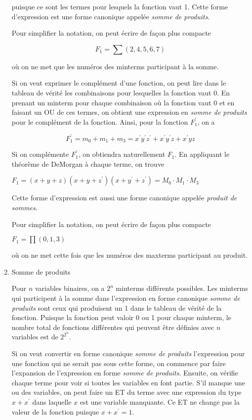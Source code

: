 \documentclass[letter, oneside]{book}
\begin{document}
\begin{enumerate}
puisque ce sont les termes pour lesquels la fonction vaut 1. Cette
forme d'expression est une forme canonique appelée \emph{somme de
produits}.

Pour simplifier la notation, on peut écrire de façon plus compacte  

$$F_1 = \sum (2, 4, 5, 6, 7)$$

où on ne met que les numéros des minterms participant à la somme.

Si on veut exprimer le complément d'une fonction, on peut lire dans le
tableau de vérité les combinaisons pour lesquelles la fonction
vaut 0. En prenant un minterm pour chaque combinaison où la fonction
vaut 0 et en faisant un OU de ces termes, on obtient une expression en
\emph{somme de produits} pour le complément de la fonction. Ainsi, pour la
fonction \(F_1^\prime\), on a

$$F_1^\prime = m_0 + m_1 + m_3 = x^\prime y^\prime z^\prime +
x^\prime y^\prime z + x^\prime y z$$

Si on complémente \(F_1^\prime\), on obtiendra naturellement
\(F_1\). En appliquant le théorème de DeMorgan à chaque terme, on
trouve

\(F_1 = (x+ y+ z)(x + y + z^\prime)(x + y^\prime + z^\prime) = M_0
\cdot M_1 \cdot M_3\)

Cette forme d'expression est aussi une forme canonique appelée
\emph{produit de sommes}.

Pour simplifier la notation, on peut écrire de façon plus compacte  

\(F_1 = \prod (0,1,3)\)

où on ne met cette fois que les numéros des maxterms participant au
produit.

\item Somme de produits
\label{sec:orgb27b710}

Pour \(n\) variables binaires, on a \(2^n\) minterms différents
possibles. Les minterms qui participent à la somme dans l'expression
en forme canonique \emph{somme de produits} sont ceux qui produisent un 1
dans le tableau de vérité de la fonction. Puisque la fonction peut
valoir 0 ou 1 pour chaque minterm, le nombre total de fonctions
différentes qui peuvent être définies avec \(n\) variables est de
\(2^{2^n}\).

Si on veut convertir en forme canonique \emph{somme de produits} l'expression
pour une fonction qui ne serait pas sous cette forme, on commence par
faire l'expansion de l'expression en forme \emph{somme de produits}. Ensuite,
on vérifie chaque terme pour voir si toutes les variables en font
partie. S'il manque une ou des variables, on peut faire un ET du
terme avec une expression du type \(x + x^\prime\) dans laquelle \(x\)
est une variable manquante. Ce ET ne change pas la valeur de la
fonction puisque \(x + x^\prime = 1\).


\end{enumerate}
\end{document}

